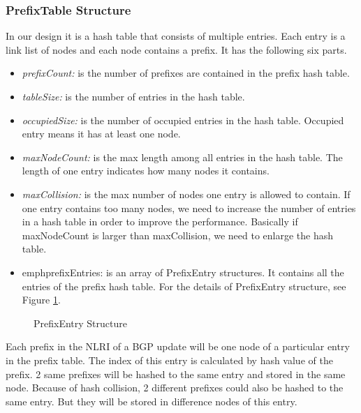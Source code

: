 \subsubsection{ PrefixTable Structure}
\label{sec:labeling:prefixtable}
In our design it is a hash table that consists of multiple entries. Each entry is a link list of nodes and each node contains a prefix. It has the following six parts.
\begin{itemize}
\item{\emph{prefixCount:} is the number of prefixes are contained in the prefix hash table.}
\item{\emph{tableSize:} is the number of entries in the hash table.}
\item{\emph{occupiedSize:} is the number of occupied entries in the hash table. Occupied entry means it has at least one node. }
\item{\emph{maxNodeCount:} is the max length among all entries in the hash table. The length of one entry indicates how many nodes it contains.}
\item{\emph{maxCollision:} is the max number of nodes one entry is allowed to contain. If one entry contains too many nodes, we need to increase the number of entries in a hash table in order to improve the performance. Basically if maxNodeCount is larger than maxCollision, we need to enlarge the hash table.}
\item{emph{prefixEntries:} is an array of PrefixEntry structures. It contains all the entries of the prefix hash table. For the details of PrefixEntry structure, see Figure \ref{fig:PrefixEntryStruct}.}
\end{itemize}
\begin{figure}
\centering
{}
\caption{PrefixEntry Structure}
\label{fig:PrefixEntryStruct}
\end{figure}
Each prefix in the NLRI of a BGP update will be one node of a particular entry in the prefix table. The index of this entry is calculated by hash value of the prefix. 
2 same prefixes will be hashed to the same entry and stored in the same node.
Because of hash collision, 2 different prefixes could also be hashed to the same entry. But they will be stored in difference nodes of this entry.

